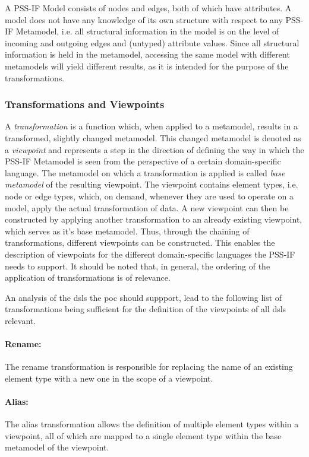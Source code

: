 A PSS-IF Model consists of nodes and edges, both of which have attributes. A model does not have any knowledge of its own structure with respect to any PSS-IF Metamodel, i.e. all structural information in the model is on the level of incoming and outgoing edges and (untyped) attribute values. Since all structural information is held in the metamodel, accessing the same model with different metamodels will yield different results, as it is intended for the purpose of the transformations.

\subsubsection{Transformations and Viewpoints}

A \textit{transformation} is a function which, when applied to a metamodel, results in a transformed, slightly changed metamodel. This changed metamodel is denoted as a \textit{viewpoint} and represents a step in the direction of defining the way in which the PSS-IF Metamodel is seen from the perspective of a certain domain-specific language. The metamodel on which a transformation is applied is called \textit{base metamodel} of the resulting viewpoint. The viewpoint contains element types, i.e. node or edge types, which, on demand, whenever they are used to operate on a model, apply the actual transformation of data. A new viewpoint can then be constructed by applying another transformation to an already existing viewpoint, which serves as it's base metamodel. Thus, through the chaining of transformations, different viewpoints can be constructed. This enables the description of viewpoints for the different domain-specific languages the PSS-IF needs to support. It should be noted that, in general, the ordering of the application of transformations is of relevance. 

An analysis of the \glspl{dsl} the \gls{poc} should suppport, lead to the following list of transformations being sufficient for the definition of the viewpoints of all \glspl{dsl} relevant.

\paragraph{Rename:} The rename transformation is responsible for replacing the name of an existing element type with a new one in the scope of a viewpoint.

\paragraph{Alias:} The alias transformation allows the definition of multiple element types within a viewpoint, all of which are mapped to a single element type within the base metamodel of the viewpoint.

